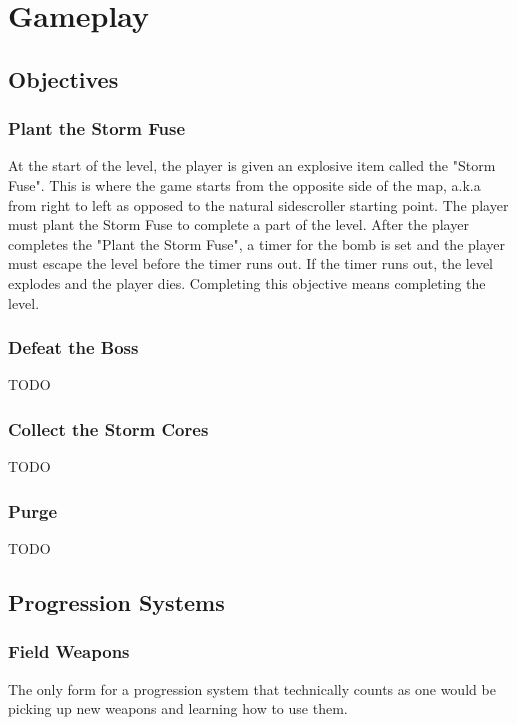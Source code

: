 \documentclass[12pt]{article}
\begin{document}
\section{Gameplay}

\subsection{Objectives}

\subsubsection{Plant the Storm Fuse}

At the start of the level, the player is given an explosive item called the "Storm Fuse". This is where the game starts from the  opposite side of the map, a.k.a from right to left as opposed to the natural sidescroller starting point. The player must plant the Storm Fuse to complete a part of the level. After the player completes the "Plant the Storm Fuse", a timer for the bomb is set and the player must escape the level before the timer runs out. If the timer runs out, the level explodes and the player dies. Completing this objective means completing the level. 

\subsubsection{Defeat the Boss}

TODO

\subsubsection{Collect the Storm Cores}

TODO

\subsubsection{Purge}

TODO

\subsection{Progression Systems}

\subsubsection{Field Weapons}

The only form for a progression system that technically counts as one would be picking up new weapons and learning how to use them. 
\end{document}
